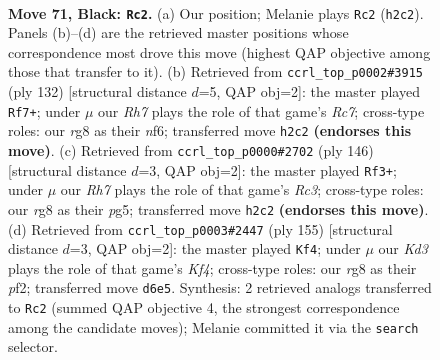 \documentclass[11pt]{article}
\begin{document}
\clearpage

\begin{figure}[p]\centering
\begin{subfigure}{0.46\textwidth}\centering
\resizebox{\linewidth}{!}{%
\newchessgame
\chessboard[
  setfen={6R1/5R2/3k4/8/1P2b3/8/7r/3K4 b - - 16 71},
  showmover=false,
  pgfstyle=straightmove, color=movearrow, markmove={h2-c2}
]}
\caption{}
\end{subfigure}\hfill
\begin{subfigure}{0.46\textwidth}\centering
\resizebox{\linewidth}{!}{%
\newchessgame
\chessboard[
  setfen={5k2/2R5/4Bnp1/1r6/3K4/8/8/8 w - - 0 67},
  showmover=false,
  pgfstyle=straightmove, color=movearrow, markmove={c7-f7}
]}
\caption{}
\end{subfigure}
\\[4pt]
\begin{subfigure}{0.46\textwidth}\centering
\resizebox{\linewidth}{!}{%
\newchessgame
\chessboard[
  setfen={8/4r3/1K6/6pB/8/2R5/5k2/8 w - - 2 74},
  showmover=false,
  pgfstyle=straightmove, color=movearrow, markmove={c3-f3}
]}
\caption{}
\end{subfigure}\hfill
\begin{subfigure}{0.46\textwidth}\centering
\resizebox{\linewidth}{!}{%
\newchessgame
\chessboard[
  setfen={6r1/8/R7/5k2/8/5b2/5P1K/8 b - - 23 78},
  showmover=false,
  pgfstyle=straightmove, color=movearrow, markmove={f5-f4}
]}
\caption{}
\end{subfigure}
\caption{\textbf{Move 71, Black: \texttt{Rc2}.} (a) Our position; Melanie plays \texttt{Rc2} (\texttt{h2c2}). Panels (b)--(d) are the retrieved master positions whose correspondence most drove this move (highest QAP objective among those that transfer to it). (b) Retrieved from \texttt{ccrl\_top\_p0002\#3915} (ply 132) [structural distance $d$=5, QAP obj=2]: the master played \texttt{Rf7+}; under $\mu$ our \emph{Rh7} plays the role of that game's \emph{Rc7}; cross-type roles: our \emph{r}g8 as their \emph{n}f6; transferred move \texttt{h2c2} \textbf{(endorses this move)}. (c) Retrieved from \texttt{ccrl\_top\_p0000\#2702} (ply 146) [structural distance $d$=3, QAP obj=2]: the master played \texttt{Rf3+}; under $\mu$ our \emph{Rh7} plays the role of that game's \emph{Rc3}; cross-type roles: our \emph{r}g8 as their \emph{p}g5; transferred move \texttt{h2c2} \textbf{(endorses this move)}. (d) Retrieved from \texttt{ccrl\_top\_p0003\#2447} (ply 155) [structural distance $d$=3, QAP obj=2]: the master played \texttt{Kf4}; under $\mu$ our \emph{Kd3} plays the role of that game's \emph{Kf4}; cross-type roles: our \emph{r}g8 as their \emph{p}f2; transferred move \texttt{d6e5}. Synthesis: 2 retrieved analogs transferred to \texttt{Rc2} (summed QAP objective 4, the strongest correspondence among the candidate moves); Melanie committed it via the \texttt{search} selector.}
\label{fig:thought-m141}
\end{figure}
\end{document}
